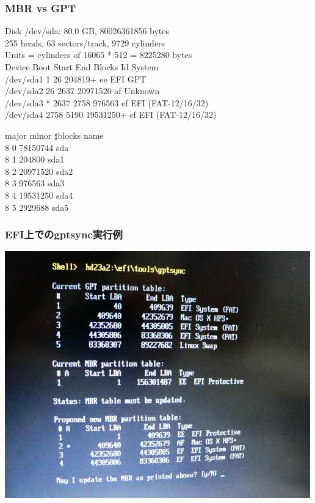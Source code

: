 \documentclass[cjk,dvipdfmx]{beamer}
\begin{document}
\begin{frame}
\frametitle{MBR vs GPT}
\begin{minipage}[t]{0.65\hsize} 
{\scriptsize
 Disk /dev/sda: 80.0 GB, 80026361856 bytes\\
255 heads, 63 sectors/track, 9729 cylinders\\
Units = cylinders of 16065 * 512 = 8225280 bytes\\

   Device Boot      Start         End      Blocks   Id  System\\
/dev/sda1               1          26      204819+  ee  EFI GPT\\
/dev/sda2              26        2637    20971520   af  Unknown\\
/dev/sda3   *        2637        2758      976563   ef  EFI (FAT-12/16/32)\\
/dev/sda4            2758        5190    19531250+  ef  EFI (FAT-12/16/32)\\
}
\end{minipage}
\begin{minipage}[t]{0.30\hsize}
{\small
 major minor  $\sharp{}$blocks  name\\

   8     0   78150744 sda\\
   8     1     204800 sda1\\
   8     2   20971520 sda2\\
   8     3     976563 sda3\\
   8     4   19531250 sda4\\
   8     5    2929688 sda5\\
}
\end{minipage}
\end{frame}

\begin{frame}
 \frametitle{EFI上でのgptsync実行例}
\includegraphics[width=0.8\hsize]{image200607/gptsync.png}
\end{frame}
\end{document}
